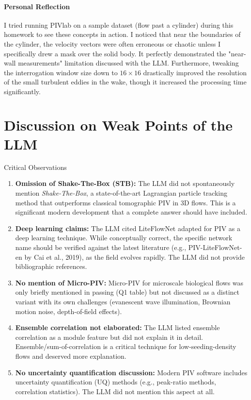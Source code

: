 \documentclass[12pt,a4paper]{article}
\begin{document}
\paragraph{Personal Reflection}
I tried running PIVlab on a sample dataset (flow past a cylinder) during this homework to see these concepts in action. I noticed that near the boundaries of the cylinder, the velocity vectors were often erroneous or chaotic unless I specifically drew a mask over the solid body. It perfectly demonstrated the "near-wall measurements" limitation discussed with the LLM. Furthermore, tweaking the interrogation window size down to $16 \times 16$ drastically improved the resolution of the small turbulent eddies in the wake, though it increased the processing time significantly.

\section{Discussion on Weak Points of the LLM}

\begin{warningbox}{Critical Observations}
\begin{enumerate}[leftmargin=1.5em]
    \item \textbf{\color{accentorange}Omission of Shake-The-Box (STB):} The LLM did not spontaneously mention \textit{Shake-The-Box}, a state-of-the-art Lagrangian particle tracking method that outperforms classical tomographic PIV in 3D flows. This is a significant modern development that a complete answer should have included.
    \item \textbf{\color{accentorange}Deep learning claims:} The LLM cited LiteFlowNet adapted for PIV as a deep learning technique. While conceptually correct, the specific network name should be verified against the latest literature (e.g., PIV-LiteFlowNet-en by Cai et al., 2019), as the field evolves rapidly. The LLM did not provide bibliographic references.
    \item \textbf{\color{accentorange}No mention of Micro-PIV:} Micro-PIV for microscale biological flows was only briefly mentioned in passing (Q1 table) but not discussed as a distinct variant with its own challenges (evanescent wave illumination, Brownian motion noise, depth-of-field effects).
    \item \textbf{\color{accentorange}Ensemble correlation not elaborated:} The LLM listed ensemble correlation as a module feature but did not explain it in detail. Ensemble/sum-of-correlation is a critical technique for low-seeding-density flows and deserved more explanation.
    \item \textbf{\color{accentorange}No uncertainty quantification discussion:} Modern PIV software includes uncertainty quantification (UQ) methods (e.g., peak-ratio methods, correlation statistics). The LLM did not mention this aspect at all.
\end{enumerate}
\end{warningbox}
\end{document}
